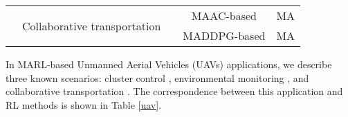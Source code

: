 \documentclass[acmsmall]{acmart}
\begin{document}
\begin{table}[]
\begin{tabularx}{\textwidth}{|XX|c|c|c|}
\multicolumn{1}{|X|}{}                                          & \multirow{2}{=}{\centering Collaborative   transportation} & \cite{10.1007/978-981-19-2635-8_71,en15197426} & MAAC-based \cite{maac}     & MA       \\ \cline{3-5} 
\multicolumn{1}{|c|}{}                                          &                                                 & \cite{9993797}                                                   & MADDPG-based \cite{maddpg} & MA       \\ \hline
\end{tabularx}
\end{table}
In MARL-based Unmanned Aerial Vehicles (UAVs) applications, we describe three known scenarios: cluster control \cite{maciel2019online,9001167,9209079,XU2020196,QIU2020515,xu_chen_2022,Xu2022}, environmental monitoring  \cite{journals/corr/abs-1803-07250,julian2019distributed,9172262, 9453825}, and collaborative transportation \cite{10.1007/978-981-19-2635-8_71,en15197426,9993797}. 
The correspondence between this application and RL methods is shown in Table \ref{uav}.
\end{document}
